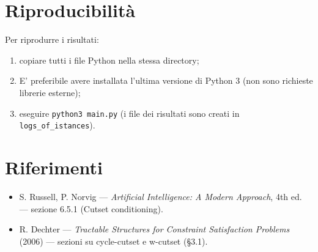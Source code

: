 \documentclass[a4paper,11pt]{article}
\begin{document}
\section{Riproducibilità}
Per riprodurre i risultati:
\begin{enumerate}
  \item copiare tutti i file Python nella stessa directory;
  \item E' preferibile avere installata l’ultima versione di Python 3 (non sono richieste librerie esterne);
  \item eseguire \texttt{python3 main.py} (i file dei risultati sono creati in \texttt{logs\_of\_istances}).
\end{enumerate}

\section*{Riferimenti}
\begin{itemize}
  \item S. Russell, P. Norvig — \emph{Artificial Intelligence: A Modern Approach}, 4th ed. — sezione 6.5.1 (Cutset conditioning).
  \item R. Dechter — \emph{Tractable Structures for Constraint Satisfaction Problems} (2006) — sezioni su cycle-cutset e w-cutset (§3.1).
\end{itemize}
\end{document}
